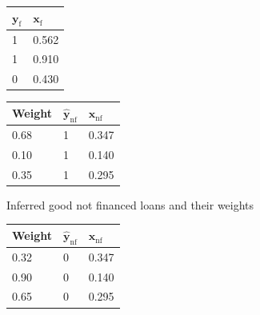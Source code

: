 \begin{table}
\caption{\label{fuzzyexample} Example of implementation of the Fuzzy Augmentation method on a small dataset}
{\setlength{\parindent}{0cm}
\begin{multicols}{4}
\small

\begin{subfigure}[t]{0.22\textwidth}
\begin{center}
\begin{adjustbox}{max width=0.95\textwidth}
\begin{tabular}{l l}
\toprule
\textbf{${\bm{y}}_{\text{f}}$} & \textbf{${\bm{x}}_{\text{f}}$}\\
\midrule
1 & 0.562 \\
1 & 0.910 \\
0 & 0.430 \\
\bottomrule
\end{tabular}
\end{adjustbox}
\end{center}

\label{fuzzy:sfig1}
\end{subfigure}

\columnbreak

\begin{subfigure}[t]{0.22\textwidth}
\begin{center}
\begin{adjustbox}{max width=0.95\textwidth}
\begin{tabular}{l l l}
\toprule
\textbf{Weight} & \textbf{$\hat{\bm{y}}_{\text{nf}}$} & \textbf{${\bm{x}}_{\text{nf}}$}\\
\midrule
0.68 & 1 & 0.347 \\
0.10 & 1 & 0.140 \\
0.35 & 1 & 0.295 \\
\bottomrule
\end{tabular}
\end{adjustbox}
\end{center}

\caption{Inferred good not financed loans and their weights}
\label{fuzzy:sfig2}
\end{subfigure}

\columnbreak

\begin{subfigure}[t]{0.22\textwidth}
\begin{center}
\begin{adjustbox}{max width=0.95\textwidth}
\begin{tabular}{l l l}
\toprule
\textbf{Weight} & \textbf{$\hat{\bm{y}}_{\text{nf}}$} & \textbf{${\bm{x}}_{\text{nf}}$}\\
\midrule
0.32 & 0 & 0.347 \\
0.90 & 0 & 0.140 \\
0.65 & 0 & 0.295 \\
\bottomrule
\end{tabular}
\end{adjustbox}
\end{center}


\end{subfigure}
\end{multicols}}
\end{table}

